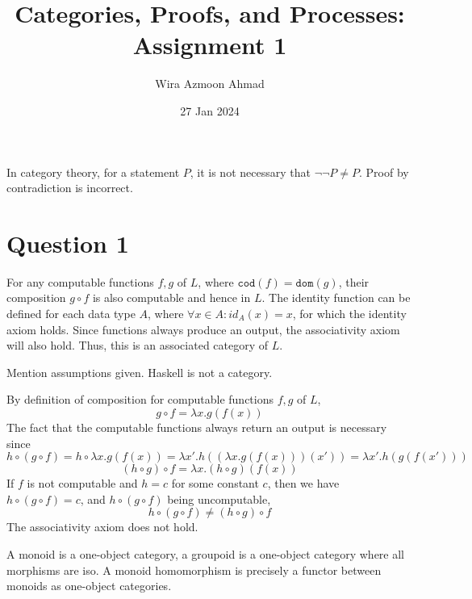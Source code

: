 \documentclass[11pt]{article} %
\title{Categories, Proofs, and Processes: \\Assignment 1}
\author{Wira Azmoon Ahmad}
\date{27 Jan 2024}
\theoremstyle{definition}
\begin{document}
%
\maketitle




{\color{teal}
In category theory, for a statement $P$, it is not necessary that $\neg \neg P \neq P$. 
Proof by contradiction is incorrect.
}

\section*{Question 1}
\addtocounter{section}{1}
For any computable functions $f,g$ of $L$, where $\texttt{cod}(f)=\texttt{dom}(g)$, 
their composition $g\circ f$ is also computable and hence in $L$.
The identity function can be defined for each data type $A$, where $\forall x\in A: id_A(x)=x$,
for which the identity axiom holds.
Since functions always produce an output, the associativity axiom will also hold.
Thus, this is an associated category of $L$.

{\color{teal} Mention assumptions given. Haskell is not a category.

By definition of composition for computable functions $f,g$ of $L$,
\[g\circ f = \lambda x. g(f(x))\]
The fact that the computable functions always return an output is necessary since
\[h\circ (g\circ f) = h \circ \lambda x.g(f(x)) 
= \lambda x'.h((\lambda x.g(f(x)))(x'))=\lambda x'.h(g(f(x')))\]
\[(h\circ g) \circ f = \lambda x. (h\circ g)(f(x))\]
If $f$ is not computable and $h=c$ for some constant $c$, 
then we have $h\circ (g\circ f)=c$, and $h\circ (g\circ f)$ being uncomputable,
\[h\circ (g\circ f) \neq (h\circ g) \circ f\]
The associativity axiom does not hold.

A monoid is a one-object category, a groupoid is a one-object category where all morphisms are iso.
A monoid homomorphism is precisely a functor between monoids as one-object categories.
}
\end{document}
